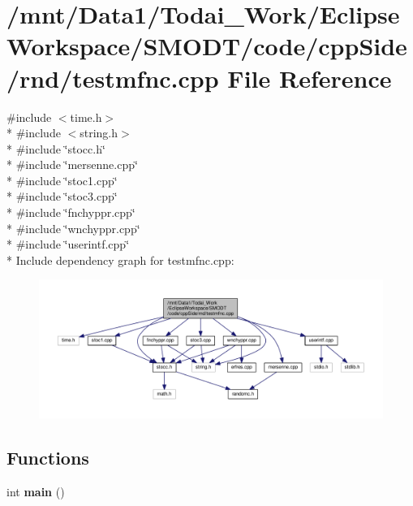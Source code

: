 \section{/mnt/\-Data1/\-Todai\-\_\-\-Work/\-Eclipse\-Workspace/\-S\-M\-O\-D\-T/code/cpp\-Side/rnd/testmfnc.cpp File Reference}
\label{rnd_2testmfnc_8cpp}
{\ttfamily \#include $<$time.\-h$>$}\\*
{\ttfamily \#include $<$string.\-h$>$}\\*
{\ttfamily \#include \char`\"{}stocc.\-h\char`\"{}}\\*
{\ttfamily \#include \char`\"{}mersenne.\-cpp\char`\"{}}\\*
{\ttfamily \#include \char`\"{}stoc1.\-cpp\char`\"{}}\\*
{\ttfamily \#include \char`\"{}stoc3.\-cpp\char`\"{}}\\*
{\ttfamily \#include \char`\"{}fnchyppr.\-cpp\char`\"{}}\\*
{\ttfamily \#include \char`\"{}wnchyppr.\-cpp\char`\"{}}\\*
{\ttfamily \#include \char`\"{}userintf.\-cpp\char`\"{}}\\*
Include dependency graph for testmfnc.\-cpp\-:
\nopagebreak
\begin{figure}[H]
\begin{center}
\leavevmode
\includegraphics[width=350pt]{rnd_2testmfnc_8cpp__incl}
\end{center}
\end{figure}
\subsection*{Functions}
\begin{DoxyCompactItemize}
\item 
int {\bf main} ()
\end{DoxyCompactItemize}
